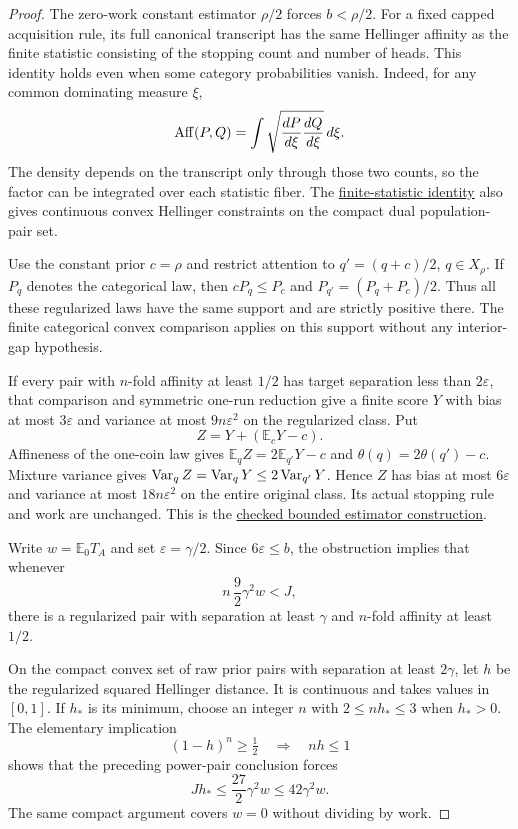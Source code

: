 \begin{proof}
The zero-work constant estimator $\rho/2$ forces $b<\rho/2$.
For a fixed capped acquisition rule, its full canonical transcript has
the same Hellinger affinity as the finite statistic consisting of the
stopping count and number of heads. This identity holds even when
some category probabilities vanish. Indeed, for any common dominating
measure $\xi$,
\[
 \operatorname{Aff}(P,Q)=\int\sqrt{\frac{dP}{d\xi}\frac{dQ}{d\xi}}\,d\xi.
\]
The density depends on the transcript only through those two counts,
so the factor can be integrated over each statistic fiber. The
\href{https://github.com/davidiach/adaptive-threshold-estimation/blob/8cf32f7e4092929d46eb87ecbb67b1e231bbcaec/lean/ThresholdHC/ConfidenceLocalization/StatisticGeometry.lean}{finite-statistic identity}
also gives continuous convex Hellinger constraints on the compact
dual population-pair set.

Use the constant prior $c=\rho$ and restrict attention to
$q'=(q+c)/2$, $q\in X_\rho$. If $P_q$ denotes the categorical law,
then $cP_q\le P_c$ and $P_{q'}=(P_q+P_c)/2$. Thus all these
regularized laws have the same support and are strictly positive
there. The finite categorical convex comparison applies on this
support without any interior-gap hypothesis.

If every pair with $n$-fold affinity at least $1/2$ has target
separation less than $2\varepsilon$, that comparison and symmetric
one-run reduction give a finite score $Y$ with bias at most
$3\varepsilon$ and variance at most $9n\varepsilon^2$ on the regularized
class. Put
\[
 Z=Y+(\mathbb E_cY-c).
\]
Affineness of the one-coin law gives
$\mathbb E_qZ=2\mathbb E_{q'}Y-c$ and
$\theta(q)=2\theta(q')-c$. Mixture variance gives
$\operatorname{Var}_qZ=\operatorname{Var}_qY\le2\operatorname{Var}_{q'}Y$. Hence $Z$ has bias at most
$6\varepsilon$ and variance at most $18n\varepsilon^2$ on the entire
original class. Its actual stopping rule and work are unchanged.
This is the
\href{https://github.com/davidiach/adaptive-threshold-estimation/blob/8cf32f7e4092929d46eb87ecbb67b1e231bbcaec/lean/ThresholdHC/ConfidenceLocalization/CappedEstimator.lean}{checked bounded estimator construction}.

\clearpage
Write $w=\mathbb E_0T_A$ and set $\varepsilon=\gamma/2$.
Since $6\varepsilon\le b$, the obstruction implies that whenever
\[
 n\,\frac92\gamma^2w<J,
\]
there is a regularized pair with separation at least $\gamma$ and
$n$-fold affinity at least $1/2$.

On the compact convex set of raw prior pairs with separation at least
$2\gamma$, let $h$ be the regularized squared Hellinger distance.
It is continuous and takes values in $[0,1]$. If $h_*$ is its minimum,
choose an integer $n$ with $2\le nh_*\le3$ when $h_*>0$.
The elementary implication
\[
 (1-h)^n\ge\tfrac12 \quad\Longrightarrow\quad nh\le1
\]
shows that the preceding power-pair conclusion forces
\[
 J h_*\le\frac{27}{2}\gamma^2w\le42\gamma^2w.
\]
The same compact argument covers $w=0$ without dividing by work.


\end{proof}
